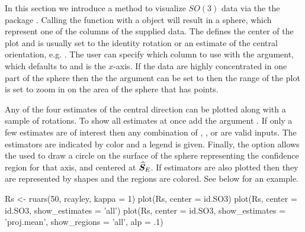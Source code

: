 In this section we introduce a method to visualize $SO(3)$ data via the the  package \citep{wickham2009}.  Calling the  function with a  object will result in a sphere, which represent one of the columns of the supplied data.  The  defines the center of the plot and is usually set to the identity rotation  or an estimate of the central orientation, e.g. .  The user can specify which column to use with the  argument, which defaults to  and is the $x$-axis.  If the data are highly concentrated in one part of the sphere then the the  argument can be set to  then the range of the plot is set to zoom in on the area of the sphere that has points. 

Any of the four estimates of the central direction can be plotted along with a sample of rotations. To show all estimates at once add the argument .  If only a few estimates are of interest then any combination of , ,  or  are valid inputs.  The estimators are indicated by color and a legend is given. Finally, the  option allows the used to draw a circle on the surface of the sphere representing the confidence region for that axis, and centered at $\widehat{\bm S}_E$.  If estimators are also plotted then they are represented by shapes and the regions are colored.  See below for an example.

\begin{example}
Rs <- ruars(50, rcayley, kappa = 1)
plot(Rs, center = id.SO3)
plot(Rs, center = id.SO3, show_estimates = 'all')
plot(Rs, center = id.SO3, show_estimates = 'proj.mean', show_regions = 'all', alp = .1)
\end{example}


